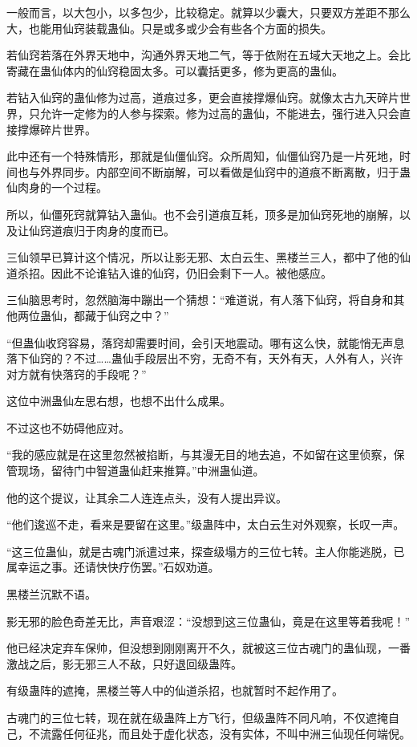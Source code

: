 \begin{this_body}
一般而言，以大包小，以多包少，比较稳定。就算以少囊大，只要双方差距不那么大，也能用仙窍装载蛊仙。只是或多或少会有些各个方面的损失。

若仙窍若落在外界天地中，沟通外界天地二气，等于依附在五域大天地之上。会比寄藏在蛊仙体内的仙窍稳固太多。可以囊括更多，修为更高的蛊仙。

若钻入仙窍的蛊仙修为过高，道痕过多，更会直接撑爆仙窍。就像太古九天碎片世界，只允许一定修为的人参与探索。修为过高的蛊仙，不能进去，强行进入只会直接撑爆碎片世界。

此中还有一个特殊情形，那就是仙僵仙窍。众所周知，仙僵仙窍乃是一片死地，时间也与外界同步。内部空间不断崩解，可以看做是仙窍中的道痕不断离散，归于蛊仙肉身的一个过程。

所以，仙僵死窍就算钻入蛊仙。也不会引道痕互耗，顶多是加仙窍死地的崩解，以及让仙窍道痕归于肉身的度而已。

三仙领早已算计这个情况，所以让影无邪、太白云生、黑楼兰三人，都中了他的仙道杀招。因此不论谁钻入谁的仙窍，仍旧会剩下一人。被他感应。

三仙脑思考时，忽然脑海中蹦出一个猜想：“难道说，有人落下仙窍，将自身和其他两位蛊仙，都藏于仙窍之中？”

“但蛊仙收窍容易，落窍却需要时间，会引天地震动。哪有这么快，就能悄无声息落下仙窍的？不过……蛊仙手段层出不穷，无奇不有，天外有天，人外有人，兴许对方就有快落窍的手段呢？”

这位中洲蛊仙左思右想，也想不出什么成果。

不过这也不妨碍他应对。

“我的感应就是在这里忽然被掐断，与其漫无目的地去追，不如留在这里侦察，保管现场，留待门中智道蛊仙赶来推算。”中洲蛊仙道。

他的这个提议，让其余二人连连点头，没有人提出异议。

“他们逡巡不走，看来是要留在这里。”级蛊阵中，太白云生对外观察，长叹一声。

“这三位蛊仙，就是古魂门派遣过来，探查级塌方的三位七转。主人你能逃脱，已属幸运之事。还请快快疗伤罢。”石奴劝道。

黑楼兰沉默不语。

影无邪的脸色奇差无比，声音艰涩：“没想到这三位蛊仙，竟是在这里等着我呢！”

他已经决定弃车保帅，但没想到刚刚离开不久，就被这三位古魂门的蛊仙现，一番激战之后，影无邪三人不敌，只好退回级蛊阵。

有级蛊阵的遮掩，黑楼兰等人中的仙道杀招，也就暂时不起作用了。

古魂门的三位七转，现在就在级蛊阵上方飞行，但级蛊阵不同凡响，不仅遮掩自己，不流露任何征兆，而且处于虚化状态，没有实体，不叫中洲三仙现任何端倪。


\end{this_body}
